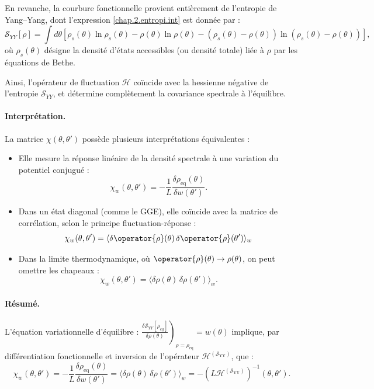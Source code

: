 En revanche, la courbure fonctionnelle provient entièrement de l'entropie de Yang–Yang, dont l’expression \eqref{chap.2.entropi.int} est donnée par :
\[
\mathcal{S}_{YY}[\rho] = \int d\theta \left[
\rho_s(\theta) \ln \rho_s(\theta) - \rho(\theta) \ln \rho(\theta) - (\rho_s(\theta) - \rho(\theta)) \ln(\rho_s(\theta) - \rho(\theta))
\right],
\]
où \(\rho_s(\theta)\) désigne la densité d’états accessibles (ou densité totale) liée à \(\rho\) par les équations de Bethe.

Ainsi, l’opérateur de fluctuation \(\mathcal{H}\) coïncide avec la hessienne négative de l'entropie \(\mathcal{S}_{YY}\), et détermine complètement la covariance spectrale à l’équilibre.


\paragraph{Interprétation.}
La matrice $\chi(\theta, \theta')$ possède plusieurs interprétations équivalentes :
\begin{itemize}[label = $\bullet$]
  \item Elle mesure la réponse linéaire de la densité spectrale à une variation du potentiel conjugué :
  \[
  \chi_w(\theta, \theta') = - \frac{1}{L}\frac{\delta \rho_{\mathrm{eq}}(\theta)}{\delta w(\theta')}.
  \]
  \item Dans un état diagonal (comme le GGE), elle coïncide avec la matrice de corrélation, selon le principe fluctuation-réponse :
  \[
  \chi_w(\theta, \theta') = \langle \delta \operator{\rho}(\theta)\, \delta \operator{\rho}(\theta') \rangle_w%
  \]
  \item Dans la limite thermodynamique, où $\operator{\rho}(\theta) \to \rho(\theta)$, on peut omettre les chapeaux :
  \[
  \chi_w(\theta, \theta') = \langle \delta \rho(\theta)\, \delta \rho(\theta') \rangle_w.
  \]
\end{itemize}

\paragraph{Résumé.}
L'équation variationnelle d'équilibre :
\(
\left.\frac{\delta \mathcal{S}_{YY}[\rho_{eq}]}{\delta \rho(\theta)} \right)_{\rho = \rho_{\mathrm{eq}}} = w(\theta)
\)
implique, par différentiation fonctionnelle et inversion de l’opérateur $\mathcal{H}^{(\mathcal{S}_{\mathrm{YY}})}$, que :
\[
\chi_w(\theta, \theta') =   - \frac{1}{L}\frac{\delta \rho_{\mathrm{eq}}(\theta)}{\delta w(\theta')} = \langle \delta \rho(\theta)\, \delta \rho(\theta') \rangle_w  = - \left( L \mathcal{H}^{(\mathcal{S}_{\mathrm{YY}})} \right)^{-1} (\theta, \theta') .
\]

